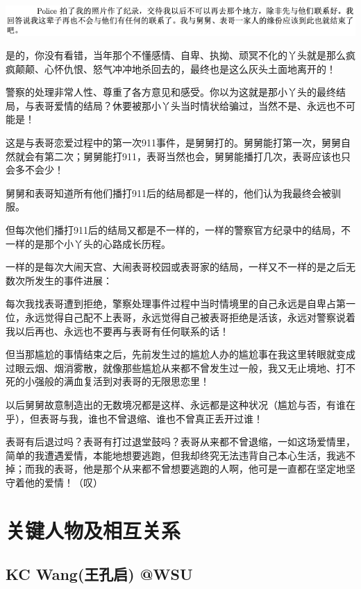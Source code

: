 \documentclass[9pt, b5paper]{article}
\begin{document}
\begin{center}
\includegraphics[width=.9\linewidth]{./pic/p1p68-6.png}
\end{center}

是的，你没有看错，当年那个不懂感情、自卑、执拗、顽冥不化的丫头就是那么疯疯颠颠、心怀仇恨、怒气冲冲地杀回去的，最终也是这么灰头土面地离开的！

警察的处理非常人性、尊重了各方意见和感受。你以为这就是那小丫头的最终结局，与表哥爱情的结局？休要被那小丫头当时情状给骗过，当然不是、永远也不可能是！

这是与表哥恋爱过程中的第一次911事件，是舅舅打的。舅舅能打第一次，舅舅自然就会有第二次；舅舅能打911，表哥当然也会，舅舅能播打几次，表哥应该也只会多不会少！

舅舅和表哥知道所有他们播打911后的结局都是一样的，他们认为我最终会被驯服。

但每次他们播打911后的结局又都是不一样的，一样的警察官方纪录中的结局，不一样的是那个小丫头的心路成长历程。

一样的是每次大闹天宫、大闹表哥校园或表哥家的结局，一样又不一样的是之后无数次所发生的事件进展：

每次我找表哥遭到拒绝，擎察处理事件过程中当时情境里的自己永远是自卑占第一位，永远觉得自己配不上表哥，永远觉得自己被表哥拒绝是活该，永远对警察说着我以后再也、永远也不要再与表哥有任何联系的话！

但当那尴尬的事情结束之后，先前发生过的尴尬人办的尴尬事在我这里转眼就变成过眼云烟、烟消雾散，就像那些尴尬从来都不曾发生过一般，我又无止境地、打不死的小强般的满血复活到对表哥的无限思恋里！

以后舅舅故意制造出的无数境况都是这样、永远都是这种状况（尴尬与否，有谁在乎），但表哥与我，谁也不曾退缩、谁也不曾真正丢开过谁！

表哥有后退过吗？表哥有打过退堂鼓吗？表哥从来都不曾退缩，一如这场爱情里，简单的我遭遇爱情，本能地想要逃跑，但我却终究无法违背自己本心生活，我逃不掉；而我的表哥，他是那个从来都不曾想要逃跑的人啊，他可是一直都在坚定地坚守着他的爱情！（叹）


\section{关键人物及相互关系}
\label{sec:org00c5e7d}
\subsection{KC Wang(王孔启) @WSU}
\label{sec:org239daa8}
\end{document}
